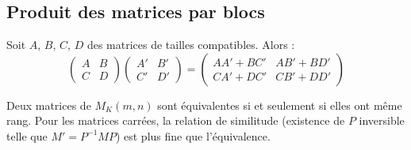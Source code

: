 \subsection{Produit des matrices par blocs}

\begin{thm}
Soit $A$, $B$, $C$, $D$ des matrices de tailles compatibles. Alors :
\[ \begin{pmatrix} A & B \\ C & D \end{pmatrix} \begin{pmatrix} A' & B' \\ C' & D' \end{pmatrix} = \begin{pmatrix} AA' + BC' & AB' + BD' \\ CA' + DC' & CB' + DD' \end{pmatrix} \]
\end{thm}

\begin{thm}
Deux matrices de $M_K(m,n)$ sont équivalentes si et seulement si elles ont même rang. Pour les matrices carrées, la relation de similitude (existence de $P$ inversible telle que $M' = P^{-1}MP$) est plus fine que l'équivalence.
\end{thm}